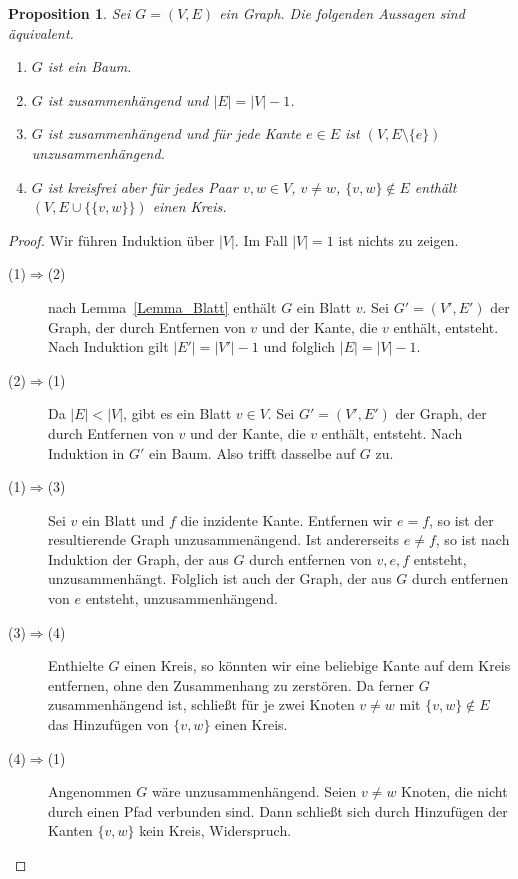 \documentclass[10pt,reqno]{amsart}
\numberwithin{equation}{section}
\newtheorem{proposition}[definition]{Proposition}
\newcommand\Lem{Lemma}
\begin{document}
\begin{proposition}\label{Lemma_Baum}
Sei $G=(V,E)$ ein Graph.
Die folgenden Aussagen sind \"aquivalent.
\begin{enumerate}
\item $G$ ist ein Baum.
\item $G$ ist zusammenh\"angend und $|E|=|V|-1$.
\item $G$ ist zusammenh\"angend und f\"ur jede Kante $e\in E$ ist $(V,E\setminus\{e\})$ unzusammenh\"angend.
\item $G$ ist kreisfrei aber f\"ur jedes Paar $v,w\in V$, $v\neq w$, $\{v,w\}\not\in E$ enth\"alt $(V,E\cup\{\{v,w\}\})$ einen Kreis.
\end{enumerate}
\end{proposition}
\begin{proof}
Wir f\"uhren Induktion \"uber $|V|$.
Im Fall $|V|=1$ ist nichts zu zeigen.
\begin{description}
\item[(1)$\Rightarrow$(2)] nach \Lem~\ref{Lemma_Blatt} enth\"alt $G$ ein Blatt $v$.
	Sei $G'=(V',E')$ der Graph, der durch Entfernen von $v$ und der Kante, die $v$ enth\"alt, entsteht.
	Nach Induktion gilt $|E'|=|V'|-1$ und folglich $|E|=|V|-1$.
\item[(2)$\Rightarrow$(1)] Da $|E|<|V|$, gibt es ein Blatt $v\in V$.
	Sei $G'=(V',E')$ der Graph, der durch Entfernen von $v$ und der Kante, die $v$ enth\"alt, entsteht.
	Nach Induktion in $G'$ ein Baum.
	Also trifft dasselbe auf $G$ zu.
\item[(1)$\Rightarrow$(3)]
	Sei $v$ ein Blatt und $f$ die inzidente Kante.
	Entfernen wir $e=f$, so ist der resultierende Graph unzusammen\"angend.
	Ist andererseits $e\neq f$, so ist nach Induktion der Graph, der aus $G$ durch entfernen von $v,e,f$ entsteht, unzusammenh\"angt.
	Folglich ist auch der Graph, der aus $G$ durch entfernen von $e$ entsteht, unzusammenh\"angend.
\item[(3)$\Rightarrow$(4)] Enthielte $G$ einen Kreis, so k\"onnten wir eine beliebige Kante auf dem Kreis entfernen, ohne den
	Zusammenhang zu zerst\"oren.
	Da ferner $G$ zusammenh\"angend ist, schlie\ss t f\"ur je zwei Knoten $v\neq w$ mit $\{v,w\}\not\in E$ das Hinzuf\"ugen von $\{v,w\}$ einen Kreis.
\item[(4)$\Rightarrow$(1)]
	Angenommen $G$ w\"are unzusammenh\"angend.
	Seien $v\neq w$ Knoten, die nicht durch einen Pfad verbunden sind.
	Dann schlie\ss t sich durch Hinzuf\"ugen der Kanten $\{v,w\}$ kein Kreis, Widerspruch.
\end{description}
\end{proof}
\end{document}
